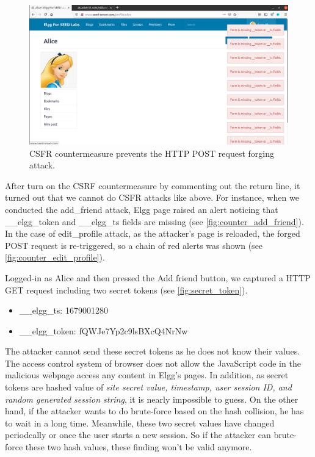 \begin{figure}
    \centering
    \includegraphics[height=\textheight,width=\textwidth,keepaspectratio]
    {figures/edit_profile_countermeasure.png}
    \caption{CSFR countermeasure prevents the HTTP POST request forging attack.}
    \label{fig:counter_edit_profile}
\end{figure}

After turn on the CSRF countermeasure by commenting out the {\selectfont
return} line, it turned out that we cannot do CSFR attacks like above. For instance,
when we conducted the {\selectfont add\_friend} attack, Elgg page raised
an alert noticing that {\selectfont \_\_elgg\_token} and
{\selectfont \_\_elgg\_ts} fields are missing
(see \autoref{fig:counter_add_friend}). In the case of {\selectfont edit\_profile}
attack, as the attacker's page is reloaded, the forged POST request is re-triggered, so
a chain of red alerts was shown (see \autoref{fig:counter_edit_profile}).

Logged-in as Alice and then pressed the {\selectfont Add friend} button,
we captured a HTTP GET request including two secret tokens (see \autoref{fig:secret_token}).

\begin{itemize}
    \item \_\_elgg\_ts: 1679001280
    \item \_\_elgg\_token: fQWJe7Yp2c9lsBXcQ4NrNw
\end{itemize}

The attacker cannot send these secret tokens as he does not know their values.
The access control system of browser does not allow the JavaScript code in the
malicious webpage access any content in Elgg's pages. In addition, as secret
tokens are hashed value of \emph{site secret value, timestamp, user session ID,
and random generated session string}, it is nearly impossible to guess. On the
other hand, if the attacker wants to do brute-force based on the hash collision,
he has to wait in a long time. Meanwhile, these two secret values have changed
periodcally or once the user starts a new session. So if the attacker can
brute-force these two hash values, these finding won't be valid anymore.
